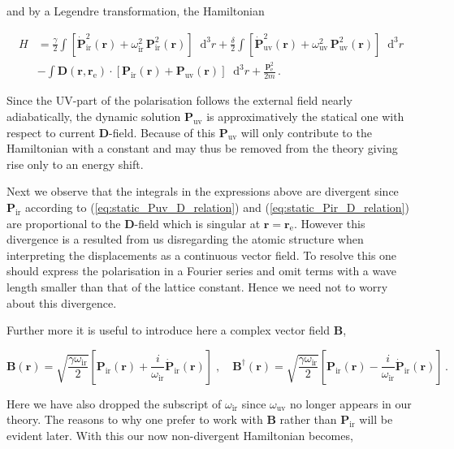 \documentclass[12pt]{report}
\renewcommand{\vec}[1]{\boldsymbol{\mathbf{#1}}}                        %
\newcommand*\diff{\mathop{}\!\mathrm{d}}
\begin{document}
and by a Legendre transformation, the Hamiltonian

\begin{equation}
	\label{eq:Hamiltonian_raw}
	\begin{split}
		H &= \frac{\gamma}{2} \int \left[ \dot{\vec P}_\text{ir}^2 (\vec r) + \omega_\text{ir}^2 \, \vec P_\text{ir}^2 (\vec r) \right] \diff^3 r
		+ \frac{\delta}{2} \int \left[ \dot{\vec P}_\text{uv}^2 (\vec r) + \omega_\text{uv}^2 \, \vec P_\text{uv}^2 (\vec r) \right] \diff^3 r \\
		&- \int \vec D(\vec r, \vec r_\text{e}) \cdot \left[ \vec P_\text{ir}(\vec r) +  \vec P_\text{uv}(\vec r) \right] \diff^3 r
		+ \frac{\vec p_\text{e}^2}{2m}	\,.
	\end{split}
\end{equation}

Since the UV-part of the polarisation follows the external field nearly adiabatically, the dynamic solution $ \vec P_\text{uv} $ is approximatively the statical one with respect to current $ \vec D $-field. Because of this $ \vec P_\text{uv} $ will only contribute to the Hamiltonian with a constant and may thus be removed from the theory giving rise only to an energy shift.

Next we observe that the integrals in the expressions above are divergent since $ \vec P_\text{ir} $ according to (\ref{eq:static_Puv_D_relation}) and (\ref{eq:static_Pir_D_relation}) are proportional to the $ \vec D $-field which is singular at $ \vec r = \vec r_\text{e} $. However this divergence is a resulted from us disregarding the atomic structure when interpreting the displacements as a continuous vector field. To resolve this one should express the polarisation in a Fourier series and omit terms with a wave length smaller than that of the lattice constant. Hence we need not to worry about this divergence.

Further more it is useful to introduce here a complex vector field $ \vec B $,

\begin{equation}
	\label{eq:B_field_def}
	\vec B(\vec r) = \sqrt{\frac{\gamma \omega_\text{ir}}{2}} \left[ \vec P_\text{ir}(\vec r) + \frac{i}{\omega_\text{ir}} \dot{\vec P}_\text{ir}(\vec r) \right]
	\; , \quad
	\vec B^\dagger(\vec r) = \sqrt{\frac{\gamma \omega_\text{ir}}{2}} \left[ \vec P_\text{ir}(\vec r) - \frac{i}{\omega_\text{ir}} \dot{\vec P}_\text{ir}(\vec r) \right] \,.
\end{equation}

Here we have also dropped the subscript of $ \omega_\text{ir} $ since $ \omega_\text{uv} $ no longer appears in our theory. The reasons to why one prefer to work with $ \vec B $ rather than $ \vec P_\text{ir} $ will be evident later. With this our now non-divergent Hamiltonian becomes,
\end{document}
